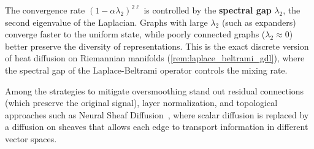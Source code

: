 \begin{remark}\label{rem:oversmoothing_geometrico}
	The convergence rate $(1-\alpha\lambda_2)^{2\ell}$ is controlled by the \textbf{spectral gap} $\lambda_2$, the second eigenvalue of the Laplacian. Graphs with large $\lambda_2$ (such as expanders) converge faster to the uniform state, while poorly connected graphs ($\lambda_2 \approx 0$) better preserve the diversity of representations. This is the exact discrete version of heat diffusion on Riemannian manifolds (\autoref{rem:laplace_beltrami_gdl}), where the spectral gap of the Laplace-Beltrami operator controls the mixing rate.

	Among the strategies to mitigate \gls{oversmoothing} stand out residual connections (which preserve the original signal), layer normalization, and topological approaches such as Neural Sheaf Diffusion~\citep{bodnar2022neural}, where scalar diffusion is replaced by a diffusion on sheaves that allows each edge to transport information in different vector spaces.
\end{remark}

